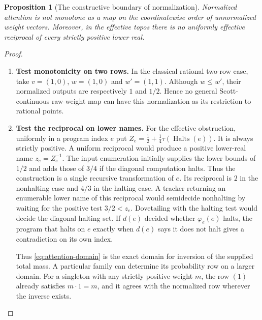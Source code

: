 \documentclass[11pt,a4paper]{article}
\newtheorem{proposition}[proposition]{Proposition}
\theoremstyle{definition}
\theoremstyle{remark}\newaliascnt{remark}{theorem}
\numberwithin{equation}{section}
\begin{document}
\begin{proposition}[The constructive boundary of normalization]
\label{prop:attention-normalization-boundary}
Normalized attention is not monotone as a map on the coordinatewise
order of unnormalized weight vectors. Moreover, in the effective topos
there is no uniformly effective reciprocal of every strictly positive
lower real.
\end{proposition}
\begin{proof}\leavevmode
\begin{enumerate}[titledsteps]
    \item \textbf{Test monotonicity on two rows.} In the classical rational two-row case, take $v=(1,0)$,
$w=(1,0)$ and $w'=(1,1)$. Although $w\le w'$, their normalized
outputs are respectively $1$ and $1/2$. Hence no general
Scott-continuous raw-weight map can have this normalization as its
restriction to rational points.


    \item \textbf{Test the reciprocal on lower names.} For the effective obstruction, uniformly in a program index $e$ put
$Z_e=\tfrac12+\tfrac14\tau(\operatorname{Halts}(e))$.
It is always strictly positive. A uniform reciprocal would produce a
positive lower-real name $z_e=Z_e^{-1}$. The input enumeration initially supplies the lower bounds of \(1/2\) and adds those of \(3/4\) if the diagonal computation halts. Thus the construction is a single recursive transformation of \(e\). Its reciprocal is \(2\) in the nonhalting case and \(4/3\) in the halting case. A tracker returning an enumerable lower name of this reciprocal would semidecide nonhalting by waiting for the positive test \(3/2<z_e\). Dovetailing with the halting test would decide the diagonal halting set. If \(d(e)\) decided whether \(\varphi_e(e)\) halts, the program that halts on \(e\) exactly when \(d(e)\) says it does not halt gives a contradiction on its own index.

Thus \eqref{eq:attention-domain} is the exact domain for inversion of the supplied total mass. A particular family can determine its probability row on a larger domain. For a singleton with any strictly positive weight $m$, the row $(1)$ already satisfies $m\cdot 1=m$, and it agrees with the normalized row wherever the inverse exists.\qedhere
\end{enumerate}
\end{proof}
\end{document}
